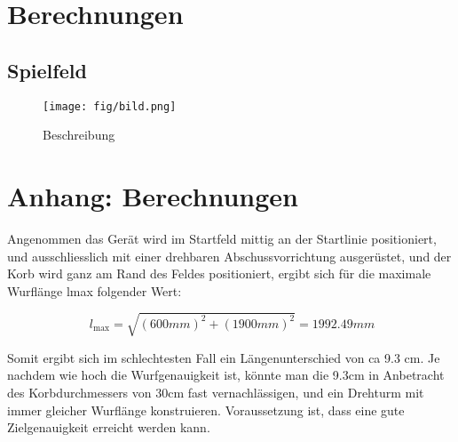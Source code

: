 \section{Berechnungen}

\subsection{Spielfeld}
\begin{figure}[h!]          %
    \centering              %

    \texttt{[image: fig/bild.png]}
    
    \caption{Beschreibung}  %
    
    \label{fig:bild}        %
\end{figure}
\noindent
\section{Anhang: Berechnungen}

Angenommen das Gerät wird im Startfeld mittig an der Startlinie positioniert, und ausschliesslich mit einer drehbaren Abschussvorrichtung ausgerüstet, und der Korb wird ganz am Rand des Feldes positioniert, ergibt sich für die maximale Wurflänge lmax folgender Wert: 

\[\ l_\text{max} = \sqrt{(600mm)^2 + (1900mm)^2} = 1992.49mm \]

Somit ergibt sich im schlechtesten Fall ein Längenunterschied von ca 9.3 cm. Je nachdem wie hoch die Wurfgenauigkeit ist, könnte man die 9.3cm in Anbetracht des Korbdurchmessers von 30cm fast vernachlässigen, und ein Drehturm mit immer gleicher Wurflänge konstruieren. Voraussetzung ist, dass eine gute Zielgenauigkeit erreicht werden kann.

